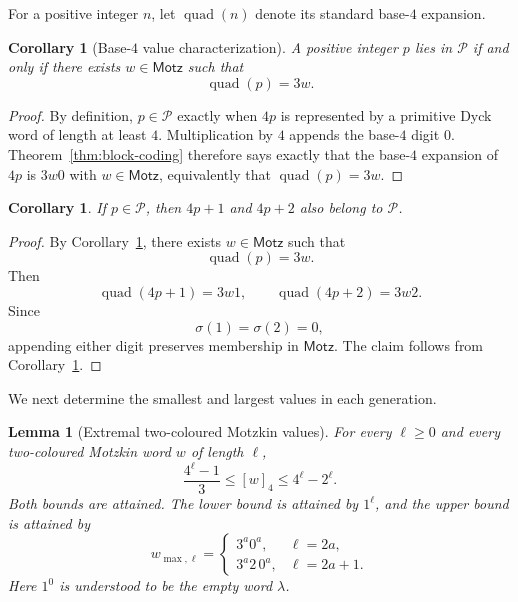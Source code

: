 \documentclass[11pt]{article}
\theoremstyle{plain}
\newtheorem{lemma}[theorem]{Lemma}
\newtheorem{corollary}[theorem]{Corollary}
\theoremstyle{definition}
\newcommand{\Pset}{\mathcal P}
\begin{document}
For a positive integer $n$, let $\operatorname{quad}(n)$ denote its
standard base-$4$ expansion.

\begin{corollary}[Base-$4$ value characterization]\label{cor:base4}
A positive integer $p$ lies in $\Pset$ if and only if there exists
$w\in\mathsf{Motz}$ such that
\begin{equation}\label{eq:base4-value-characterization}
 \operatorname{quad}(p)=3w.
\end{equation}
\end{corollary}

\begin{proof}
By definition, $p\in\Pset$ exactly when $4p$ is represented by a primitive
Dyck word of length at least $4$.  Multiplication by $4$ appends the
base-$4$ digit $0$.  Theorem~\ref{thm:block-coding} therefore says exactly
that the base-$4$ expansion of $4p$ is $3w0$ with
$w\in\mathsf{Motz}$, equivalently that
$\operatorname{quad}(p)=3w$.
\end{proof}
\begin{corollary}\label{cor:Pclosure}
If $p\in\Pset$, then $4p+1$ and $4p+2$ also belong to $\Pset$.
\end{corollary}

\begin{proof}
By Corollary~\ref{cor:base4}, there exists $w\in\mathsf{Motz}$ such that
\[
 \operatorname{quad}(p)=3w.
\]
Then
\[
 \operatorname{quad}(4p+1)=3w1,
 \qquad
 \operatorname{quad}(4p+2)=3w2.
\]
Since
\[
 \sigma(1)=\sigma(2)=0,
\]
appending either digit preserves membership in $\mathsf{Motz}$.  The claim follows from
Corollary~\ref{cor:base4}.
\end{proof}

We next determine the smallest and largest values in each generation.

\begin{lemma}[Extremal two-coloured Motzkin values]\label{lem:extremal}
For every $\ell\geq0$ and every two-coloured Motzkin word $w$ of length $\ell$,
\begin{equation}\label{eq:motzkin-extrema}
  \frac{4^{\ell}-1}{3}\leq[w]_4\leq4^{\ell}-2^{\ell}.
\end{equation}
Both bounds are attained.  The lower bound is attained by $1^{\ell}$, and the
upper bound is attained by
\[
  w_{\max,\ell}=
  \begin{cases}
    3^a0^a,&\ell=2a,\\
    3^a2\,0^a,&\ell=2a+1.
  \end{cases}
\]
Here $1^0$ is understood to be the empty word $\lambda$.
\end{lemma}
\end{document}
